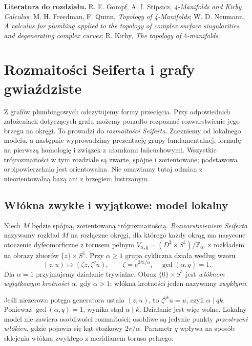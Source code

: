\medskip
\noindent\textbf{Literatura do rozdziału.}
R. E. Gompf, A. I. Stipsicz, \emph{4-Manifolds and Kirby Calculus};
M. H. Freedman, F. Quinn, \emph{Topology of 4-Manifolds};
W. D. Neumann, \emph{A calculus for plumbing applied to the
topology of complex surface singularities and degenerating complex
curves}; R. Kirby, \emph{The topology of $4$-manifolds}.


\chapter{Rozmaitości Seiferta i grafy gwiaździste}
\label{ch:tg-seifert}

Z grafów plumbingowych odczytujemy formy przecięcia.
Przy odpowiednich założeniach dotyczących grafu możemy
ponadto rozpoznać rozwarstwienie jego brzegu na okręgi.
To prowadzi do \emph{rozmaitości Seiferta}. Zaczniemy od lokalnego
modelu, a następnie wyprowadzimy prezentację grupy fundamentalnej,
formułę na pierwszą homologię i związek z ułamkami łańcuchowymi.
Wszystkie trójrozmaitości w tym rozdziale są zwarte, spójne i zorientowane;
podstawowa orbipowierzchnia jest orientowalna. Nie omawiamy tutaj
odmian z nieorientowalną bazą ani z brzegiem lustrzanym.

\section{Włókna zwykłe i wyjątkowe: model lokalny}
\label{sec:tg-seifert-model}

\begin{definicja}
Niech $M$ będzie spójną, zorientowaną trójrozmaitością.
\emph{Rozwarstwieniem Seiferta} nazywamy rozkład $M$ na rozłączne
okręgi, dla którego każdy okrąg ma nasycone otoczenie dyfeomorficzne
z torusem pełnym $V_{\alpha,q}=(D^2\times S^1)/\mathbb Z_\alpha$,
z rozkładem na obrazy zbiorów $\{z\}\times S^1$.
Przy $\alpha\geq1$ grupa cykliczna działa według wzoru
\[
(z,u)\longmapsto(\zeta z,\zeta^q u),\qquad
\zeta=e^{2\pi i/\alpha},\quad \gcd(\alpha,q)=1.
\]
Dla $\alpha=1$ przyjmujemy działanie trywialne. Obraz
$\{0\}\times S^1$ jest \emph{włóknem wyjątkowym krotności $\alpha$},
gdy $\alpha>1$; włókna krotności jeden nazywamy \emph{zwykłymi}.
\end{definicja}

\begin{uwaga}
Jeśli niezerowa potęga generatora ustala $(z,u)$, to
$\zeta^{qk}u=u$, czyli $\alpha\mid qk$. Ponieważ
$\gcd(\alpha,q)=1$, wynika stąd $\alpha\mid k$.
Działanie jest więc wolne. Lokalny model nie zawiera
osobliwości rozmaitości; osobliwe są jedynie punkty
\emph{przestrzeni włókien}, gdzie pojawia się kąt stożkowy
$2\pi/\alpha$. Parametr $q$ wpływa na sposób sklejenia
włókna zwykłego z meridianem torusa pełnego.
\end{uwaga}

